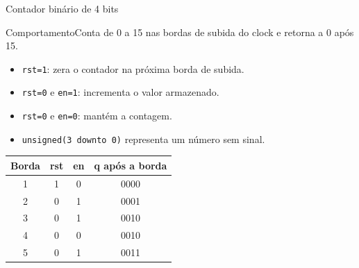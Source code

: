 \begin{frame}[t]{Contador binário de 4 bits}
\small
\begin{block}{Comportamento}Conta de 0 a 15 nas bordas de subida do clock e retorna a 0 após 15.\end{block}
\begin{itemize}
\item \texttt{rst=1}: zera o contador na próxima borda de subida.
\item \texttt{rst=0} e \texttt{en=1}: incrementa o valor armazenado.
\item \texttt{rst=0} e \texttt{en=0}: mantém a contagem.
\item \texttt{unsigned(3 downto 0)} representa um número sem sinal.
\end{itemize}
\begin{center}\footnotesize
\begin{tabular}{c|cc|c}
Borda & rst & en & q após a borda\\\hline
1 & 1 & 0 & 0000\\
2 & 0 & 1 & 0001\\
3 & 0 & 1 & 0010\\
4 & 0 & 0 & 0010\\
5 & 0 & 1 & 0011
\end{tabular}\end{center}
\end{frame}
